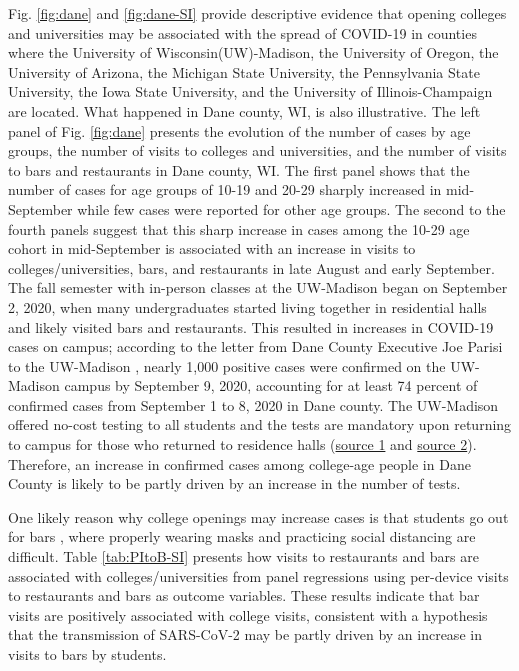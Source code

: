 \documentclass[9pt,twoside,lineno]{pnas-new}
\theoremstyle{definition}
\begin{document}
Fig.  \ref{fig:dane} and \ref{fig:dane-SI}  provide descriptive evidence that opening colleges and universities may be associated with the spread of COVID-19 in counties where the University of Wisconsin(UW)-Madison, the University of Oregon, the University of Arizona,  the Michigan State University, the Pennsylvania State University, the Iowa State University, and the University of Illinois-Champaign are located. What happened in Dane county, WI, is also illustrative. The left panel of  Fig.  \ref{fig:dane} presents the evolution of the number of cases by age groups,  the number of visits to colleges and universities, and the number of visits to bars and restaurants in Dane county, WI. The first panel shows that the number of cases for age groups of 10-19  and 20-29 sharply increased in mid-September while few cases were reported for other age groups. The second to the fourth panels suggest that this sharp increase in cases among the 10-29 age cohort in mid-September is associated with an increase in visits to colleges/universities, bars, and restaurants in late August and early September. The fall semester with in-person classes at the UW-Madison began on September 2, 2020, when many undergraduates started living together in residential halls and likely visited bars and restaurants. This resulted in increases in COVID-19 cases on campus; according to the letter from Dane County Executive Joe Parisi to the UW-Madison \cite{parisi2020}, nearly 1,000 positive cases were confirmed on the UW-Madison campus by September 9, 2020, accounting for at least 74 percent of confirmed cases from September 1 to 8, 2020 in Dane county.  The UW-Madison offered no-cost testing to all students and the tests are mandatory upon returning to campus for those who returned to residence halls (\href{https://news.wisc.edu/uw-madison-establishes-free-campus-wide-covid-19-testing-to-support-campus-reopening/}{source 1} and \href{https://chancellor.wisc.edu/blog/uw-in-a-semester-of-covid/}{source 2}). Therefore, an increase in confirmed cases among college-age people  in Dane County is likely to be partly driven by an increase in the number of tests. %

One likely reason why college openings may increase cases is that students go out for bars \citep{Fisher2020,Chang2021}, where properly wearing masks and practicing social distancing are difficult.  Table \ref{tab:PItoB-SI} presents how visits to restaurants and bars are associated with colleges/universities from panel regressions using per-device visits to restaurants and bars as outcome variables. These results indicate that bar visits are positively associated with college visits, consistent with a hypothesis that the transmission of SARS-CoV-2 may be partly driven by an increase in visits to bars by students.
 
\end{document}

